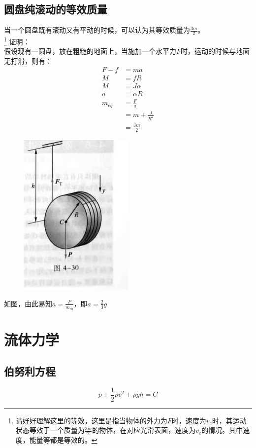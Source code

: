\documentclass{ctexart}
\begin{document}
\subsection{圆盘纯滚动的等效质量}
当一个圆盘既有滚动又有平动的时候，可以认为其等效质量为$\frac{3m}{2}$。\\
\footnote{请好好理解这里的等效，这里是指当物体的外力为$F$时，速度为$v_c$时，其运动状态等效于一个质量为$\frac{3m}{2}$的物体，在对应光滑表面，速度为$v_c$的情况。其中速度，能量等都是等效的。}
证明：\\
假设现有一圆盘，放在粗糙的地面上，当施加一个水平力$F$时，运动的时候与地面无打滑，则有：
\begin{align*}
    F - f   & = ma                \\
    M       & = fR                \\
    M       & = J \alpha          \\
    a       & = \alpha R          \\
    m_{eq}  & = \frac{F}{a}       \\
            & = m + \frac{J}{R^2} \\
            & = \frac{3m}{2}
\end{align*}
\begin{figure}[H]
    \centering
    \includegraphics[width=0.5\textwidth]{img/4-30.jpg}
\end{figure}
如图，由此易知$a = \frac{P}{m_{eq}}$，即$a = \frac{2}{3}g $
\section{流体力学}
\subsection{伯努利方程}
$$  
    p + \frac{1}{2} \rho v^2 + \rho gh = C
$$
\end{document}
